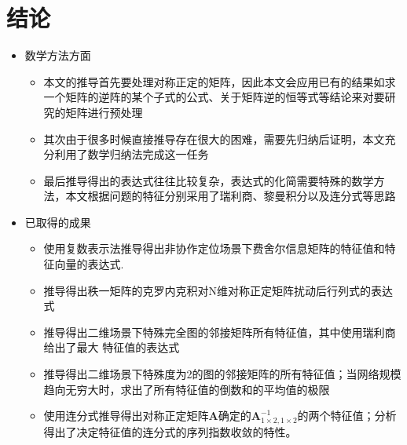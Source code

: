 \section{结论}\label{section:conclusion}
  \begin{itemize}
  \item
  数学方法方面
  \begin{itemize}
  \item 本文的推导首先要处理对称正定的矩阵，因此本文会应用已有的结果如求一个矩阵的逆阵的某个子式的公式、关于矩阵逆的恒等式等结论来对要研究的矩阵进行预处理
  \item 其次由于很多时候直接推导存在很大的困难，需要先归纳后证明，本文充分利用了数学归纳法完成这一任务
  \item 最后推导得出的表达式往往比较复杂，表达式的化简需要特殊的数学方法，本文根据问题的特征分别采用了瑞利商、黎曼积分以及连分式等思路
  \end{itemize}
  \item
    已取得的成果
  \begin{itemize}
  \item
    使用复数表示法推导得出非协作定位场景下费舍尔信息矩阵的特征值和特征向量的表达式.
  \item
    推导得出秩一矩阵的克罗内克积对N维对称正定矩阵扰动后行列式的表达式
  \item
    推导得出二维场景下特殊完全图的邻接矩阵所有特征值，其中使用瑞利商给出了最大 特征值的表达式
  \item 推导得出二维场景下特殊度为2的图的邻接矩阵的所有特征值；当网络规模趋向无穷大时，求出了所有特征值的倒数和的平均值的极限
  \item 使用连分式推导得出对称正定矩阵$\bm{A}$确定的$\bm{A}^{-1}_{1\times2,1\times2}$的两个特征值；分析得出了决定特征值的连分式的序列指数收敛的特性。
  \end{itemize}
  \end{itemize}
